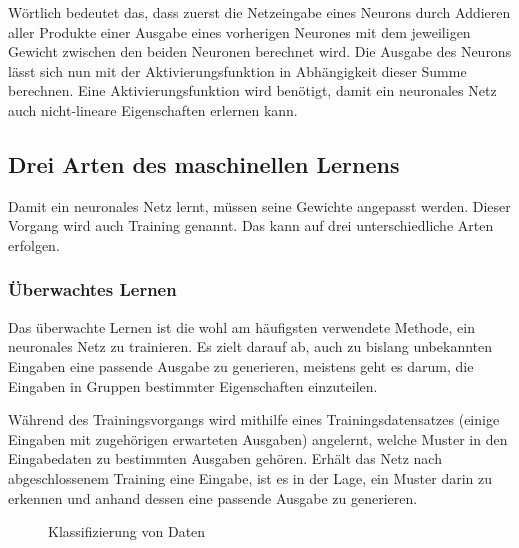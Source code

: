 \documentclass[12pt,a4]{article}
\begin{document}
Wörtlich bedeutet das, dass zuerst die Netzeingabe eines Neurons durch Addieren aller Produkte einer Ausgabe eines vorherigen Neurones mit dem jeweiligen Gewicht zwischen den beiden Neuronen berechnet wird. Die Ausgabe des Neurons lässt sich nun mit der Aktivierungsfunktion in Abhängigkeit dieser Summe berechnen. Eine Aktivierungsfunktion wird benötigt, damit ein neuronales Netz auch nicht-lineare Eigenschaften erlernen kann.

\subsection{Drei Arten des maschinellen Lernens \cite{PythonMachineLearningChapter1}}
Damit ein neuronales Netz lernt, müssen seine Gewichte angepasst werden. Dieser Vorgang wird auch Training genannt. Das kann auf drei unterschiedliche Arten erfolgen.

\subsubsection{Überwachtes Lernen}
Das überwachte Lernen ist die wohl am häufigsten verwendete Methode, ein neuronales Netz zu trainieren. Es zielt darauf ab, auch zu bislang unbekannten Eingaben eine passende Ausgabe zu generieren, meistens geht es darum, die Eingaben in Gruppen bestimmter Eigenschaften einzuteilen. 

Während des Trainingsvorgangs wird mithilfe eines Trainingsdatensatzes (einige Eingaben mit zugehörigen erwarteten Ausgaben) angelernt, welche Muster in den Eingabedaten zu bestimmten Ausgaben gehören. Erhält das Netz nach abgeschlossenem Training eine Eingabe, ist es in der Lage, ein Muster darin zu erkennen und anhand dessen eine passende Ausgabe zu generieren.

\begin{figure}[!h]
\centering
{}
\caption{Klassifizierung von Daten}
\label{fig:SupervisedLearning}
\end{figure}
\end{document}
